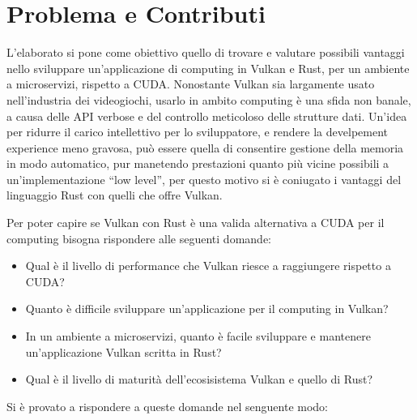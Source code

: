 \section[Problema e Contributi]{Problema e Contributi}


L'elaborato si pone come obiettivo quello di trovare e valutare possibili vantaggi nello sviluppare un'applicazione di computing in Vulkan e Rust, per un ambiente a microservizi, rispetto a CUDA.
Nonostante Vulkan sia largamente usato nell'industria dei videogiochi, usarlo in ambito computing è una sfida non banale, a causa delle API verbose e del controllo meticoloso delle strutture dati. 
Un'idea per ridurre il carico intellettivo per lo sviluppatore, e rendere la develpement experience meno gravosa, può essere quella di consentire gestione della memoria in modo automatico, pur manetendo prestazioni quanto più vicine possibili a un'implementazione ``low level'', per questo motivo si è coniugato i vantaggi del linguaggio Rust con quelli che offre Vulkan. 

Per poter capire se Vulkan con Rust è una valida alternativa a CUDA per il computing bisogna rispondere alle seguenti domande:

\begin{itemize}
    \item Qual è il livello di performance che Vulkan riesce a raggiungere rispetto a CUDA? 
    \item Quanto è difficile sviluppare un'applicazione per il computing in Vulkan?
    \item In un ambiente a microservizi, quanto è facile sviluppare e mantenere un'applicazione Vulkan scritta in Rust? 
    \item Qual è il livello di maturità dell'ecosisistema Vulkan e quello di Rust?
\end{itemize}

Si è provato a rispondere a queste domande nel senguente modo:


